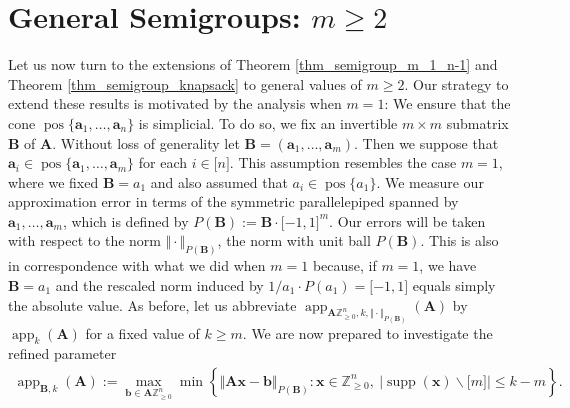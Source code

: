 \documentclass[pdflatex]{sn-jnl}
\DeclareMathOperator{\app}{app}
\DeclareMathOperator{\pos}{pos}
\DeclareMathOperator{\supp}{supp}
\newcommand{\Z}{\mathbb{Z}}
\newcommand{\bA}{\bm{A}}
\newcommand{\bx}{\bm{x}}
\newcommand{\bb}{\bm{b}}
\newcommand{\ba}{\bm{a}}
\newcommand{\bB}{\bm{B}}
\theoremstyle{thmstyleone}%
\theoremstyle{thmstyletwo}%
\theoremstyle{thmstylethree}%
\begin{document}
	\section{General Semigroups: $m\geq 2$}
	Let us now turn to the  extensions of Theorem \ref{thm_semigroup_m_1_n-1} and Theorem \ref{thm_semigroup_knapsack} to general values of  $m\geq 2$. Our strategy to extend these results is
	motivated by the analysis when $m=1$: We ensure that the cone $\pos\lbrace \ba_1,\ldots,\ba_n\rbrace$ is simplicial. To do so, we fix an invertible $m\times m$ submatrix $\bB$ of $\bA$. Without loss of generality let $\bB = (\ba_1,\ldots,\ba_m)$. Then we suppose that $\ba_i\in\pos\lbrace \ba_1,\ldots,\ba_m\rbrace$ for each $i\in\lbrack n\rbrack$. This assumption resembles the case $m=1$, where we fixed $\bB = a_1$ and also assumed that $a_i \in\pos\lbrace a_1\rbrace$. 
	We measure our approximation error in terms of the symmetric parallelepiped spanned by $\ba_1,\ldots,\ba_m$, which is defined by $P(\bB) := \bB\cdot \lbrack -1,1 \rbrack^m$. Our errors will be taken with respect to the norm $\Vert\cdot\Vert_{P(\bB)}$, the norm with unit ball $P(\bB)$. 
	This is also in correspondence with what we did when $m=1$ because, if $m=1$, we have $\bB = a_1$ and the rescaled norm induced by $1/a_1\cdot P(a_1) = \lbrack -1,1\rbrack$ equals simply the absolute value. 
	As before, let us abbreviate $\app_{\bA\Z^n_{\geq 0},k,\Vert\cdot\Vert_{P(\bB)}}(\bA)$ by $\app_k(\bA)$ for a fixed value of $k\geq m$. 
	We are now prepared to investigate the refined parameter
	\begin{align*}
		\app_{\bB,k}(\bA) := \max_{\bb\in\bA\Z^n_{\geq 0}}\min \left\lbrace \Vert \bA\bx - \bb\Vert_{P(\bB)} : \bx\in \Z^n_{\geq 0}, \ \left|\supp(\bx)\backslash \lbrack m \rbrack \right|\leq k - m\right\rbrace.
	\end{align*}
	
\end{document}
